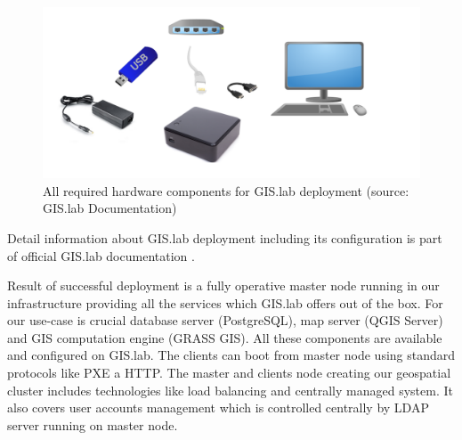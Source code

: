 \documentclass{isprs}
\begin{document}
\begin{figure}[ht!]
\begin{center}
  \includegraphics[width=1.0\columnwidth]{figures/installation-unit.png}
  \caption{All required hardware components for GIS.lab deployment
    (source: GIS.lab Documentation)}
\label{fig:gislab_infrastructure}
\end{center}
\end{figure}

Detail information about GIS.lab deployment including its
configuration is part of official GIS.lab documentation
\cite{gislab-docs}.

Result of successful deployment is a fully operative master node
running in our infrastructure providing all the services which GIS.lab
offers out of the box. For our use-case is crucial database server
(PostgreSQL), map server (QGIS Server) and GIS computation engine
(GRASS GIS). All these components are available and configured on
GIS.lab. The clients can boot from master node using standard
protocols like PXE a HTTP. The master and clients node creating our
geospatial cluster includes technologies like load balancing and
centrally managed system. It also covers user accounts management
which is controlled centrally by LDAP server running on master node.
\end{document}
